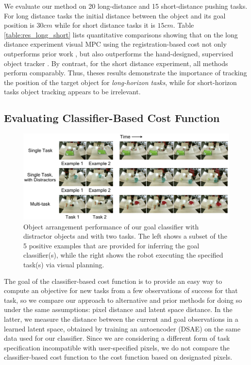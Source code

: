 We evaluate our method on 20 long-distance and 15 short-distance pushing tasks. For long distance tasks the initial distance between the object and its goal position is $30cm$ while for short distance tasks it is $15cm$. Table \ref{table:res_long_short} lists quantitative comparisons showing that on the long distance experiment
visual MPC using the registration-based cost not only outperforms prior work \cite{sna}, but also outperforms the hand-designed, supervised object tracker \cite{babenko2009visual}. By contrast, for the short distance experiment,
all methods perform comparably. Thus, theses results demonstrate the importance of tracking the position of the target object for \emph{long-horizon tasks}, while for short-horizon tasks object tracking appears to be irrelevant. 
\subsection{Evaluating Classifier-Based Cost Function}
\label{subsec:eval_classifier}

\begin{figure}
	\centering
	\includegraphics[width=1.0\columnwidth]{images_cls/cls_results_3.jpeg}
	\caption{\small Object arrangement performance of our goal classifier with distractor objects and with two tasks. The left shows a subset of the 5 positive examples that are provided for inferring the goal classifier(s), while the right shows the robot executing the specified task(s) via visual planning.}
	\label{fig:cls_results}
	\vspace{-0.3cm}
\end{figure}

The goal of the classifier-based cost function is to provide an easy way to compute an objective for new tasks from a few observations of success for that task, so we compare our approach to alternative and prior methods for doing so under the same assumptions: pixel distance and latent space distance. In the latter, we measure the distance between the current and goal observations in a learned latent space, obtained by training an autoencoder (DSAE) \cite{dsae} on the same data used for our classifier. Since we are considering a different form of task specification incompatible with user-specified pixels, we do not compare the classifier-based cost function to the cost function based on designated pixels.

